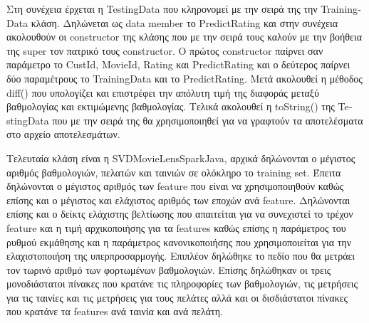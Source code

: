 \documentclass{report}
\begin{document}
Στη συνέχεια έρχεται η \textlatin{TestingData} που κληρονομεί με την σειρά της την \textlatin{TrainingData} κλάση. Δηλώνεται ως \textlatin{data member} το \textlatin{PredictRating} και στην συνέχεια ακολουθούν οι \textlatin{constructor} της κλάσης που με την σειρά τους καλούν με την βοήθεια της \textlatin{super} τον πατρικό τους \textlatin{constructor}. Ο πρώτος \textlatin{constructor} παίρνει σαν παράμετρο το \textlatin{CustId, MovieId, Rating} και \textlatin{PredictRating} και ο δεύτερος παίρνει δύο παραμέτρους το \textlatin{TrainingData} και το \textlatin{PredictRating}. Μετά ακολουθεί η μέθοδος \textlatin{diff}() που υπολογίζει και επιστρέφει την απόλυτη τιμή της διαφοράς μεταξύ βαθμολογίας και εκτιμώμενης βαθμολογίας. Τελικά ακολουθεί η \textlatin{toString}() της \textlatin{TestingData} που με την σειρά της θα χρησιμοποιηθεί για να γραφτούν τα αποτελέσματα στο αρχείο αποτελεσμάτων.

Τελευταία κλάση είναι η \textlatin{SVDMovieLensSparkJava}, αρχικά δηλώνονται ο μέγιστος αριθμός βαθμολογιών, πελατών και ταινιών σε ολόκληρο το \textlatin{training set}. Έπειτα δηλώνονται ο μέγιστος αριθμός των \textlatin{feature} που είναι να χρησιμοποιηθούν καθώς επίσης και ο μέγιστος και ελάχιστος αριθμός των εποχών ανά \textlatin{feature}. Δηλώνονται επίσης και ο δείκτς ελάχιστης βελτίωσης που απαιτείται για να συνεχιστεί το τρέχον \textlatin{feature} και η τιμή αρχικοποιήσης για τα \textlatin{features} καθώς επίσης η παράμετρος του ρυθμού εκμάθησης και η παράμετρος κανονικοποιήσης που χρησιμοποιείται για την ελαχιστοποιήση της υπερπροσαρμογής. Επιπλέον δηλώθηκε το πεδίο που θα μετράει τον τωρινό αριθμό των φορτωμένων βαθμολογιών. Επίσης δηλώθηκαν οι τρεις μονοδιάστατοι πίνακες που κρατάνε τις πληροφορίες των βαθμολογιών, τις μετρήσεις για τις ταινίες και τις μετρήσεις για τους πελάτες αλλά και οι δισδιάστατοι πίνακες που κρατάνε τα \textlatin{features} ανά ταινία και ανά πελάτη.
\end{document}
